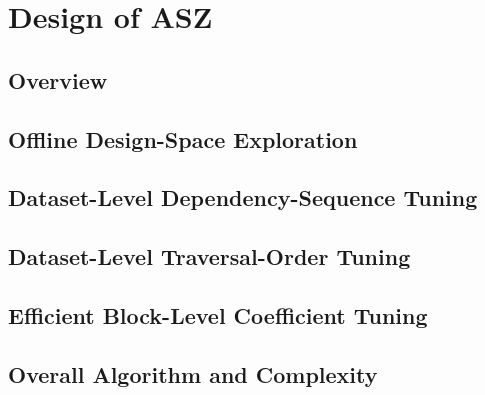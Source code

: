 \section{Design of ASZ}

\subsection{Overview}

\subsection{Offline Design-Space Exploration}

\subsection{Dataset-Level Dependency-Sequence Tuning}

\subsection{Dataset-Level Traversal-Order Tuning}

\subsection{Efficient Block-Level Coefficient Tuning}

\subsection{Overall Algorithm and Complexity}